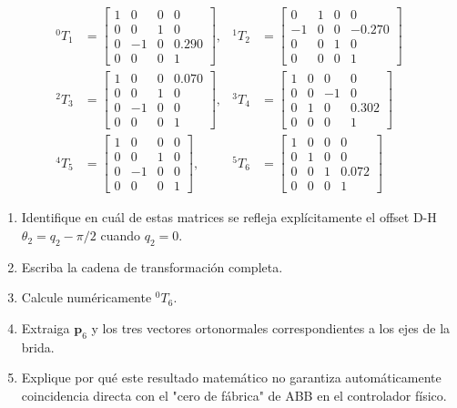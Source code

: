 \documentclass[11pt, a4paper]{article}
\begin{document}
\begin{align*}
    {}^{0}T_1 &= \begin{bmatrix} 1&0&0&0 \\ 0&0&1&0 \\ 0&-1&0&0.290 \\ 0&0&0&1 \end{bmatrix}, &
    {}^{1}T_2 &= \begin{bmatrix} 0&1&0&0 \\ -1&0&0&-0.270 \\ 0&0&1&0 \\ 0&0&0&1 \end{bmatrix} \\
    {}^{2}T_3 &= \begin{bmatrix} 1&0&0&0.070 \\ 0&0&1&0 \\ 0&-1&0&0 \\ 0&0&0&1 \end{bmatrix}, &
    {}^{3}T_4 &= \begin{bmatrix} 1&0&0&0 \\ 0&0&-1&0 \\ 0&1&0&0.302 \\ 0&0&0&1 \end{bmatrix} \\
    {}^{4}T_5 &= \begin{bmatrix} 1&0&0&0 \\ 0&0&1&0 \\ 0&-1&0&0 \\ 0&0&0&1 \end{bmatrix}, &
    {}^{5}T_6 &= \begin{bmatrix} 1&0&0&0 \\ 0&1&0&0 \\ 0&0&1&0.072 \\ 0&0&0&1 \end{bmatrix}
\end{align*}

\begin{enumerate}
    \item Identifique en cuál de estas matrices se refleja explícitamente el offset D-H $\theta_2 = q_2 - \pi/2$ cuando $q_2 = 0$.
    \item Escriba la cadena de transformación completa.
    \item Calcule numéricamente ${}^{0}T_6$.
    \item Extraiga $\mathbf{p}_6$ y los tres vectores ortonormales correspondientes a los ejes de la brida.
    \item Explique por qué este resultado matemático no garantiza automáticamente coincidencia directa con el "cero de fábrica" de ABB en el controlador físico.
\end{enumerate}
\end{document}
